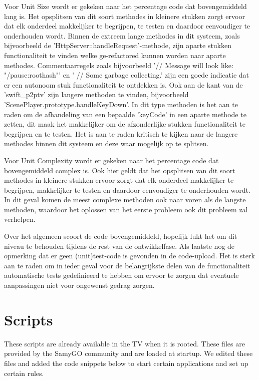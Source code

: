 Voor Unit Size wordt er gekeken naar het percentage code dat bovengemiddeld lang is. Het opsplitsen van dit soort methodes in kleinere stukken zorgt ervoor dat elk onderdeel makkelijker te begrijpen, te testen en daardoor eenvoudiger te onderhouden wordt. Binnen de extreem lange methodes in dit systeem, zoals bijvoorbeeld de 'HttpServer::handleRequest'-methode, zijn aparte stukken functionaliteit te vinden welke ge-refactored kunnen worden naar aparte methodes. Commentaarregels zoals bijvoorbeeld '// Message will look like: "/pause:roothash"' en ' // Some garbage collecting.' zijn een goede indicatie dat er een autonoom stuk functionaliteit te ontdekken is. Ook aan de kant van de 'swift\_p2ptv' zijn langere methoden te vinden, bijvoorbeeld 'ScenePlayer.prototype.handleKeyDown'. In dit type methoden is het aan te raden om de afhandeling van een bepaalde 'keyCode' in een aparte methode te zetten, dit maak het makkelijker om de afzonderlijke stukken functionaliteit te begrijpen en te testen. Het is aan te raden kritisch te kijken naar de langere methodes binnen dit systeem en deze waar mogelijk op te splitsen.

Voor Unit Complexity wordt er gekeken naar het percentage code dat bovengemiddeld complex is. Ook hier geldt dat het opsplitsen van dit soort methodes in kleinere stukken ervoor zorgt dat elk onderdeel makkelijker te begrijpen, makkelijker te testen en daardoor eenvoudiger te onderhouden wordt. In dit geval komen de meest complexe methoden ook naar voren als de langste methoden, waardoor het oplossen van het eerste probleem ook dit probleem zal verhelpen.

Over het algemeen scoort de code bovengemiddeld, hopelijk lukt het om dit niveau te behouden tijdens de rest van de ontwikkelfase. Als laatste nog de opmerking dat er geen (unit)test-code is gevonden in de code-upload. Het is sterk aan te raden om in ieder geval voor de belangrijkste delen van de functionaliteit automatische tests gedefinieerd te hebben om ervoor te zorgen dat eventuele aanpassingen niet voor ongewenst gedrag zorgen.

\chapter{Scripts}
These scripts are already available in the TV when it is rooted. These files are provided by the SamyGO community and are loaded at startup. We edited these files and added the code snippets below to start certain applications and set up certain rules.

